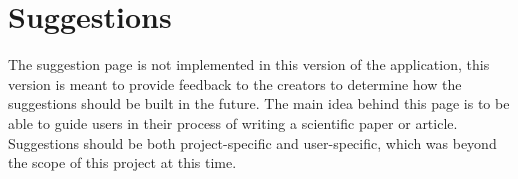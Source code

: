 \section{Suggestions}

The suggestion page is not implemented in this version of the application, this version is meant to provide feedback to the creators
to determine how the suggestions should be built in the future. The main idea behind this page is to be able to guide users in their
process of writing a scientific paper or article. Suggestions should be both project-specific and user-specific, which was beyond
the scope of this project at this time.